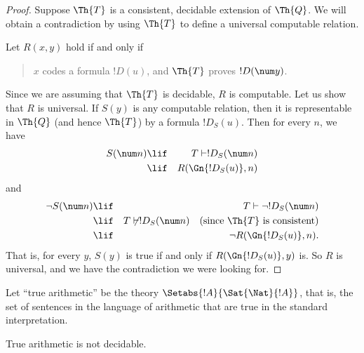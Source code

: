 \documentclass[../../../include/open-logic-section]{subfiles}
\begin{document}
\begin{proof}
Suppose $\Th{T}$ is a consistent, decidable
extension of $\Th{Q}$. We will obtain a contradiction by using $\Th{T}$ to
define a universal computable relation.

Let $R(x,y)$ hold if and only if
\begin{quote}
$x$ codes a formula $!D(u)$, and $\Th{T}$ proves $!D(\num y)$.
\end{quote}
Since we are assuming that $\Th{T}$ is decidable, $R$ is computable. Let us
show that $R$ is universal. If $S(y)$ is any computable relation, then
it is representable in $\Th{Q}$ (and hence $\Th{T}$) by a formula
$!D_S(u)$. Then for every $n$, we have
\begin{eqnarray*}
S(\num n) & \lif & T \vdash !D_S(\num n) \\
& \lif & R(\Gn{!D_S(u)}, n)
\end{eqnarray*}
and
\begin{eqnarray*}
\lnot S(\num n) & \lif & T \vdash \lnot !D_S(\num n) \\
& \lif & T \not\vdash !D_S(\num n) \quad \text{(since $\Th{T}$ is
  consistent)} \\
& \lif & \lnot R(\Gn{!D_S(u)}, n).
\end{eqnarray*}
That is, for every $y$, $S(y)$ is true if and only if
$R(\Gn{!D_S(u)}, y)$ is. So $R$ is universal, and we have the
contradiction we were looking for.
\end{proof}

Let ``true arithmetic'' be the theory $\Setabs{!A}{ \Sat{\Nat}{!A}}$,
that is, the set of sentences in the language of arithmetic that are
true in the standard interpretation.

\begin{cor}
True arithmetic is not decidable.
\end{cor}

\end{document}
